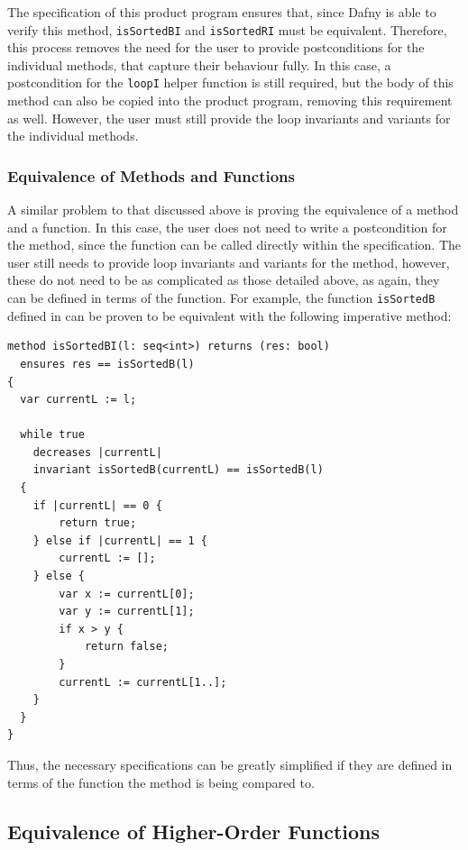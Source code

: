 \documentclass[a4paper, 11pt]{article}
\begin{document}
%
The specification of this product program ensures that, since Dafny is able to verify this method, \lstinline|isSortedBI| and \lstinline|isSortedRI| must be equivalent. Therefore, this process removes the need for the user to provide postconditions for the individual methods, that capture their behaviour fully. In this case, a postcondition for the \lstinline|loopI| helper function is still required, but the body of this method can also be copied into the product program, removing this requirement as well. However, the user must still provide the loop invariants and variants for the individual methods.

\subsubsection{Equivalence of Methods and Functions}

A similar problem to that discussed above is proving the equivalence of a method and a function. In this case, the user does not need to write a postcondition for the method, since the function can be called directly within the specification. The user still needs to provide loop invariants and variants for the method, however, these do not need to be as complicated as those detailed above, as again, they can be defined in terms of the function. For example, the function \lstinline|isSortedB| defined in  can be proven to be equivalent with the following imperative method:
\begin{lstlisting}[caption=\lstinline|isSortedBI| Method with simplified specifications]
method isSortedBI(l: seq<int>) returns (res: bool)
  ensures res == isSortedB(l)
{
  var currentL := l;

  while true
    decreases |currentL|
    invariant isSortedB(currentL) == isSortedB(l)
  {
    if |currentL| == 0 {
        return true;
    } else if |currentL| == 1 {
        currentL := [];
    } else {
        var x := currentL[0];
        var y := currentL[1];
        if x > y {
            return false;
        }
        currentL := currentL[1..];
    }
  }
}
\end{lstlisting}
%
Thus, the necessary specifications can be greatly simplified if they are defined in terms of the function the method is being compared to.

\subsection{Equivalence of Higher-Order Functions}
\end{document}
